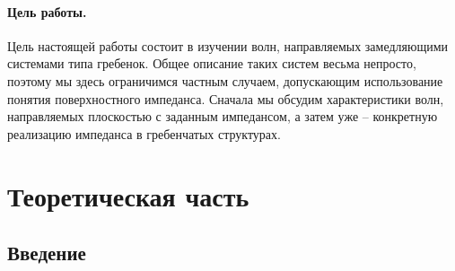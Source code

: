

\def\labauthors{Войтович Д.А., Понур К.А.}
\def\labgroup{440}
\def\labnumber{2}
\def\labtheme{Замедляющие системы типа гребенки}
\def\department{Кафедра электродинамики}

\newpage
\paragraph{Цель работы.} 

Цель настоящей работы состоит в изучении волн, направляемых замедляющими системами типа гребенок. Общее описание таких систем весьма непросто, поэтому мы здесь ограничимся частным случаем, допускающим использование понятия поверхностного импеданса. Сначала мы обсудим характеристики волн, направляемых плоскостью с заданным импедансом, а затем уже --
конкретную реализацию импеданса в гребенчатых структурах.

\section{Теоретическая часть}
\subsection{Введение}



